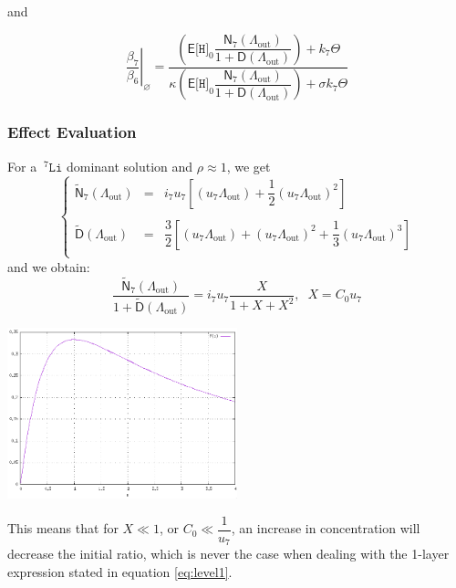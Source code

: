 \documentclass[aps,onecolumn,11pt]{revtex4}
\newcommand{\mychem}[1]{\mathtt{#1}}
\newcommand{\myconc}[1]{\big[#1\big]}
\newcommand{\spLi}[1]{{\!~^{#1}\mychem{Li}}}
\newcommand{\spproton}{\mychem{H}}
\newcommand{\proton}{\myconc{\spproton}}
\newcommand{\myout}[1]{{#1}_{\mathrm{out}}}
\newcommand{\LiAll}{\Lambda}
\newcommand{\LiAllOut}{\myout{\LiAll}}
\begin{document}
and

\begin{equation}
\left.\dfrac{\beta_7}{\beta_6}\right\vert_{\varnothing} = 
\dfrac{
	\left(\mathsf{E}\proton_0 \dfrac{\mathsf{N}_7(\LiAllOut)}{1+\mathsf{D}(\LiAllOut)}\right) + k_7 \Theta 
}
{
	\kappa \left(\mathsf{E}\proton_0 \dfrac{\mathsf{N}_7(\LiAllOut)}{1+\mathsf{D}(\LiAllOut)}\right) + \sigma k_7 \Theta 
}
\end{equation}


\subsubsection{Effect Evaluation}
For a $\spLi{7}$ dominant solution and $\rho\approx1$, we get
\begin{equation}
\left\lbrace
\begin{array}{rcl}
	\widetilde{\mathsf{N}}_7(\LiAllOut) & = &  {i_7 u_7}  \left[ \left(u_7\LiAllOut\right) + \dfrac{1}{2} \left(u_7\LiAllOut\right)^2\right]\\
	\\
	\widetilde{\mathsf{D}}(\LiAllOut)   & = & \dfrac{3}{2} \left[  \left(u_7\LiAllOut\right) + \left(u_7\LiAllOut\right)^2 + \dfrac{1}{3} \left(u_7\LiAllOut\right)^3 \right] \\
\end{array}
\right.
\end{equation}
and we obtain:
\begin{equation}
	\dfrac{\widetilde{\mathsf{N}}_7(\LiAllOut)}{1+\widetilde{\mathsf{D}}(\LiAllOut)} =  {i_7 u_7} \dfrac{X}{1+X+X^2},\;\; X=C_0u_7
\end{equation}

\begin{center}
	\includegraphics[width=0.5\textwidth]{f.png}
\end{center}
This means that for $X\ll 1$, or $C_0\ll\dfrac{1}{u_7}$, an increase in concentration will decrease the initial ratio, which is never the case when dealing with
the 1-layer expression stated in equation \eqref{eq:level1}.
\end{document}
